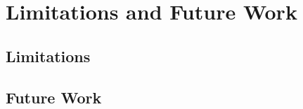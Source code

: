 \section{Limitations and Future Work}
\label{sec:limitations}


\subsection{Limitations}

\subsection{Future Work}
